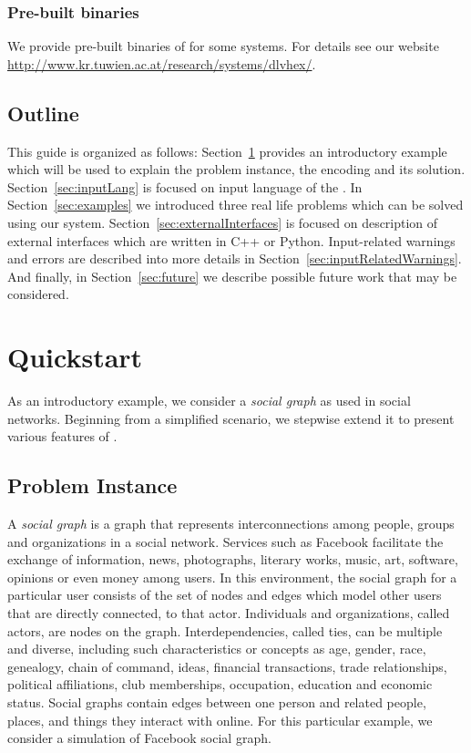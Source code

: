 \documentclass[14pt,a4paper, titlepage]{article}
\begin{document}
\subsubsection{Pre-built binaries}
We provide pre-built binaries of \dlvhex{} for some systems. For details see our website \url{http://www.kr.tuwien.ac.at/research/systems/dlvhex/}. 

\subsection{Outline}
This guide is organized as follows: Section~\ref{sec:quick} provides an introductory example which will be used to explain the problem instance, the encoding and its solution. Section~\ref{sec:inputLang} is focused on input language of the \dlvhex{}. In Section~\ref{sec:examples} we introduced three real life problems which can be solved using our system. Section~\ref{sec:externalInterfaces} is focused on description of external interfaces which are written in C++ or Python. Input-related warnings and errors are described into more details in Section~\ref{sec:inputRelatedWarnings}. And finally, in Section~\ref{sec:future} we describe possible future work that may be considered.

\section{Quickstart} %
\label{sec:quick}
As an introductory example, we consider a \emph{social graph} as used in social networks. Beginning from a simplified scenario, we stepwise extend it to present various features of \dlvhex{}.

\subsection{Problem Instance}
A \emph{social graph} is a graph that represents interconnections among people, groups 
and organizations in a social network. Services such as Facebook facilitate the exchange 
of information, news, photographs, literary works, music, art, software, opinions or even 
money among users. In this environment, the social graph for a particular user consists 
of the set of nodes and edges which model other users that are directly connected, to that actor. 
Individuals and organizations, called actors, are nodes on the graph. Interdependencies, 
called ties, can be multiple and diverse, including such characteristics or concepts as age, 
gender, race, genealogy, chain of command, ideas, financial transactions, trade relationships, 
political affiliations, club memberships, occupation, education and economic status. 
Social graphs contain edges between one person and related people, places, and things they interact 
with online. For this particular example, we consider a simulation of Facebook social graph. 
\end{document}
